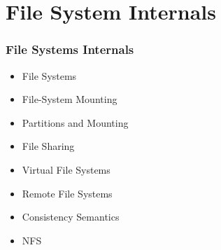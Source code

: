 \documentclass[aspectratio=169, xcolor=table, notheorems, hyperref={pdfpagelabels=false}]{beamer}
\begin{document}
\section{File System Internals}
\begin{frame}[fragile]
\frametitle{File Systems Internals}
\begin{itemize}
\item File Systems
\item File-System Mounting
\item Partitions and Mounting
\item File Sharing
\item Virtual File Systems
\item Remote File Systems
\item Consistency Semantics
\item NFS
\end{itemize}
\end{frame}

\end{document}
